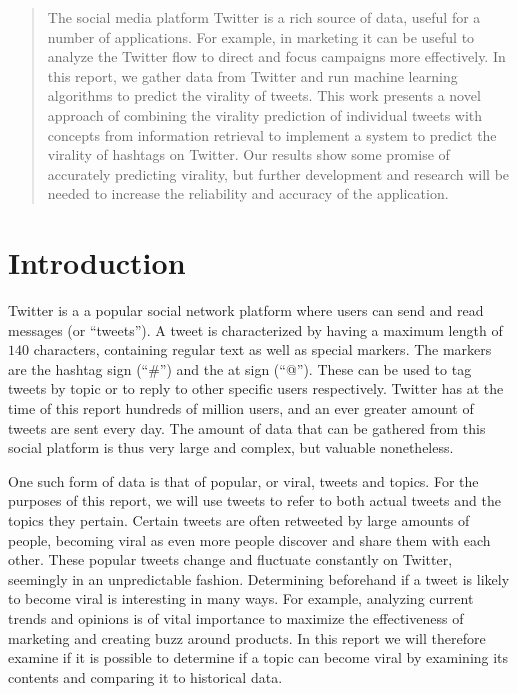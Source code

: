 \begin{abstract}
\noindent The social media platform Twitter is a rich source of data, useful for a number of applications. For example, in marketing it can be useful to analyze the Twitter flow to direct and focus campaigns more effectively. In this report, we gather data from Twitter and run machine learning algorithms to predict the virality of tweets. This work presents a novel approach of combining the virality prediction of individual tweets with concepts from information retrieval to implement a system to predict the virality of hashtags on Twitter. Our results show some promise of accurately predicting virality, but further development and research will be needed to increase the reliability and accuracy of the application.
\end{abstract}

\section{Introduction}
\noindent Twitter is a a popular social network platform where users can send and read messages (or ``tweets'').
A tweet is characterized by having a maximum length of $140$ characters, containing regular text as well as special markers.
The markers are the hashtag sign (``\#'') and the at sign (``@''). These can be used to tag tweets by topic or to reply to other specific users respectively. 
Twitter has at the time of this report hundreds of million users, and an ever greater amount of tweets are sent every day.
The amount of data that can be gathered from this social platform is thus very large and complex, but valuable nonetheless.

One such form of data is that of popular, or viral, tweets and topics.
For the purposes of this report, we will use tweets to refer to both actual tweets and the topics they pertain.
Certain tweets are often retweeted by large amounts of people, becoming viral as even more people discover and share them with each other.
These popular tweets change and fluctuate constantly on Twitter, seemingly in an unpredictable fashion.
Determining beforehand if a tweet is likely to become viral is interesting in many ways.
For example, analyzing current trends and opinions is of vital importance to maximize the effectiveness of marketing and creating buzz around products.
In this report we will therefore examine if it is possible to determine if a topic can become viral by examining its contents and comparing it to historical data.


